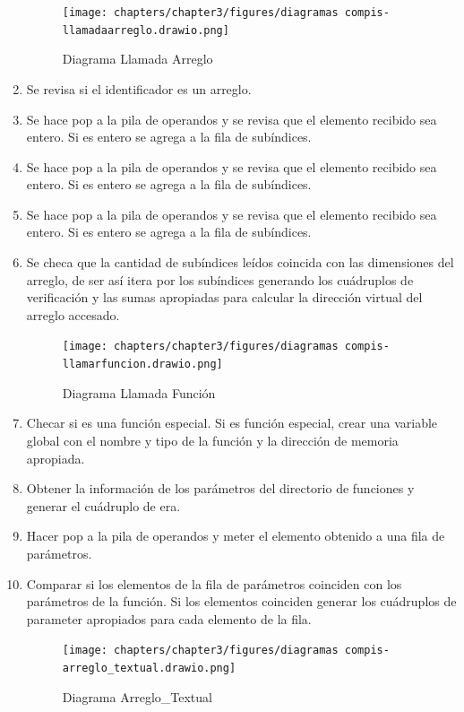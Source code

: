 \begin{enumerate}
    \begin{figure}[!htbp]
            \centering
            \texttt{[image: chapters/chapter3/figures/diagramas compis-llamadaarreglo.drawio.png]}
            \caption{Diagrama Llamada Arreglo}
            \label{fig:my_label}
    \end{figure}
    \FloatBarrier
    \item Se revisa si el identificador es un arreglo. 
    \item Se hace pop a la pila de operandos y se revisa que el elemento recibido sea entero. Si es entero se agrega a la fila de subíndices.
    \item Se hace pop a la pila de operandos y se revisa que el elemento recibido sea entero. Si es entero se agrega a la fila de subíndices.
    \item Se hace pop a la pila de operandos y se revisa que el elemento recibido sea entero. Si es entero se agrega a la fila de subíndices.
    \item Se checa que la cantidad de subíndices leídos coincida con las dimensiones del arreglo, de ser así itera por los subíndices generando los cuádruplos de verificación y las sumas apropiadas para calcular la dirección virtual del arreglo accesado.
    
    \newpage
    \begin{figure}[!htbp]
            \centering
            \texttt{[image: chapters/chapter3/figures/diagramas compis-llamarfuncion.drawio.png]}
            \caption{Diagrama Llamada Función}
            \label{fig:my_label}
    \end{figure}
    \FloatBarrier
    
    \item Checar si es una función especial. Si es función especial, crear una variable global con el nombre y tipo de la función y la dirección de memoria apropiada.
    \item Obtener la información de los parámetros del directorio de funciones y generar el cuádruplo de era.
    \item Hacer pop a la pila de operandos y meter el elemento obtenido a una fila de parámetros.
    \item Comparar si los elementos de la fila de parámetros coinciden con los parámetros de la función. Si los elementos coinciden generar los cuádruplos de parameter apropiados para cada elemento de la fila.
    
    \newpage
    \begin{figure}[!htbp]
            \centering
            \texttt{[image: chapters/chapter3/figures/diagramas compis-arreglo\_textual.drawio.png]}
            \caption{Diagrama Arreglo\_Textual}
            \label{fig:my_label}
    \end{figure}
    \FloatBarrier
    

\end{enumerate}
